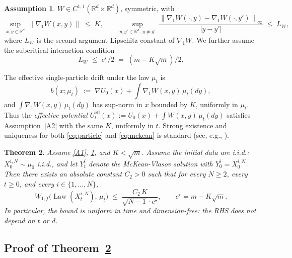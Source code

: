 \documentclass[11pt]{article}
\newtheorem{theorem}{Theorem}
\theoremstyle{definition}
\newtheorem{assumption}[theorem]{Assumption}
\DeclareMathOperator{\Law}{Law}
\newcommand{\R}{\mathbb{R}}
\newcommand{\norm}[1]{\left\lVert #1 \right\rVert}
\newcommand{\abs}[1]{\left\lvert #1 \right\rvert}
\begin{document}
\begin{assumption}\label{A5}
$W \in C^{1,1}(\R^d \times \R^d)$, symmetric, with
\[
\sup_{x, y \in \R^d}\,\norm{\nabla_1 W(x, y)} \;\le\; K, \qquad \sup_{y, y' \in \R^d,\, y \ne y'}\,\frac{\norm{\nabla_1 W(\cdot, y) - \nabla_1 W(\cdot, y')}_\infty}{\abs{y - y'}} \;\le\; L_W,
\]
where $L_W$ is the second-argument Lipschitz constant of $\nabla_1 W$. We further assume the subcritical interaction condition
\begin{equation}\label{eq:LW-cond}
L_W \;\le\; c^\star/2 \;=\; (m - K\sqrt m)/2.
\end{equation}
\end{assumption}

The effective single-particle drift under the law $\mu_t$ is
\[
b(x; \mu_t) \;:=\; \nabla U_0(x) + \int \nabla_1 W(x, y)\,\mu_t(dy),
\]
and $\int \nabla_1 W(x, y)\,\mu_t(dy)$ has sup-norm in $x$ bounded by $K$, uniformly in $\mu_t$. Thus the \emph{effective potential} $U_t^{\mathrm{eff}}(x) := U_0(x) + \int W(x, y)\, \mu_t(dy)$ satisfies Assumption~\ref{A2} with the same $K$, uniformly in $t$. Strong existence and uniqueness for both \eqref{eq:particle} and \eqref{eq:mckean} is standard (see, e.g., \cite{Sznitman1991}).

\begin{theorem}\label{thm:poc}
Assume \ref{A1}, \ref{A5}, and $K < \sqrt m$. Assume the initial data are i.i.d.: $X^{i,N}_0 \sim \mu_0$ i.i.d., and let $Y^i_t$ denote the McKean-Vlasov solution with $Y^i_0 = X^{i,N}_0$. Then there exists an absolute constant $C_2 > 0$ such that for every $N \ge 2$, every $t \ge 0$, and every $i \in \{1, \dots, N\}$,
\begin{equation}\label{eq:poc}
W_{1,f}\bigl(\Law(X^{i,N}_t),\, \mu_t\bigr) \;\le\; \frac{C_2\, K}{\sqrt{N - 1}\cdot c^\star}, \qquad c^\star = m - K\sqrt m.
\end{equation}
In particular, the bound is \emph{uniform in time} and \emph{dimension-free}: the RHS does not depend on $t$ or $d$.
\end{theorem}

\subsection{Proof of Theorem~\ref{thm:poc}}
\end{document}
